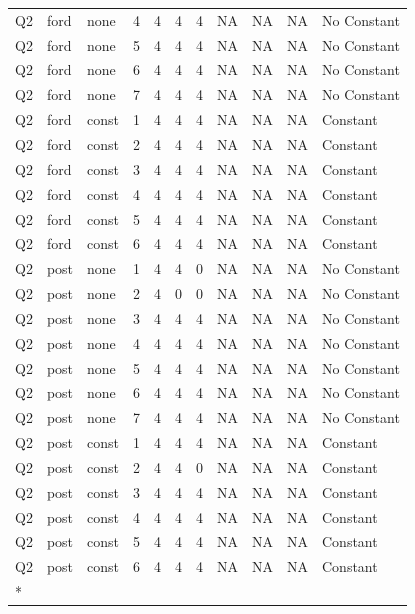 \begin{longtable}[t]{lllrrrrllll}
Q2 & ford & none & 4 & 4 & 4 & 4 & NA & NA & NA & No Constant\\
Q2 & ford & none & 5 & 4 & 4 & 4 & NA & NA & NA & No Constant\\
Q2 & ford & none & 6 & 4 & 4 & 4 & NA & NA & NA & No Constant\\
\addlinespace
Q2 & ford & none & 7 & 4 & 4 & 4 & NA & NA & NA & No Constant\\
Q2 & ford & const & 1 & 4 & 4 & 4 & NA & NA & NA & Constant\\
Q2 & ford & const & 2 & 4 & 4 & 4 & NA & NA & NA & Constant\\
Q2 & ford & const & 3 & 4 & 4 & 4 & NA & NA & NA & Constant\\
Q2 & ford & const & 4 & 4 & 4 & 4 & NA & NA & NA & Constant\\
\addlinespace
Q2 & ford & const & 5 & 4 & 4 & 4 & NA & NA & NA & Constant\\
Q2 & ford & const & 6 & 4 & 4 & 4 & NA & NA & NA & Constant\\
Q2 & post & none & 1 & 4 & 4 & 0 & NA & NA & NA & No Constant\\
Q2 & post & none & 2 & 4 & 0 & 0 & NA & NA & NA & No Constant\\
Q2 & post & none & 3 & 4 & 4 & 4 & NA & NA & NA & No Constant\\
\addlinespace
Q2 & post & none & 4 & 4 & 4 & 4 & NA & NA & NA & No Constant\\
Q2 & post & none & 5 & 4 & 4 & 4 & NA & NA & NA & No Constant\\
Q2 & post & none & 6 & 4 & 4 & 4 & NA & NA & NA & No Constant\\
Q2 & post & none & 7 & 4 & 4 & 4 & NA & NA & NA & No Constant\\
Q2 & post & const & 1 & 4 & 4 & 4 & NA & NA & NA & Constant\\
\addlinespace
Q2 & post & const & 2 & 4 & 4 & 0 & NA & NA & NA & Constant\\
Q2 & post & const & 3 & 4 & 4 & 4 & NA & NA & NA & Constant\\
Q2 & post & const & 4 & 4 & 4 & 4 & NA & NA & NA & Constant\\
Q2 & post & const & 5 & 4 & 4 & 4 & NA & NA & NA & Constant\\
Q2 & post & const & 6 & 4 & 4 & 4 & NA & NA & NA & Constant\\*
\end{longtable}
\endgroup{}
